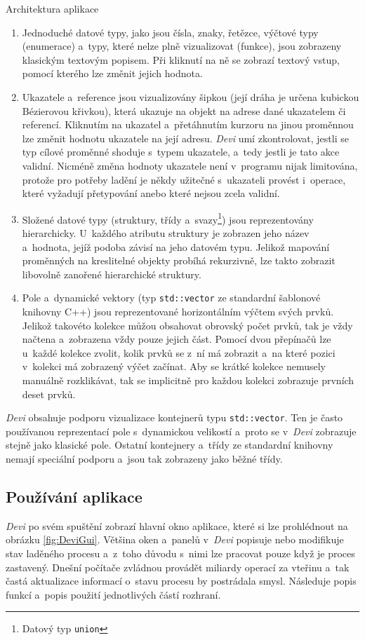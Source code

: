 \documentclass[czech,bachelor,male,python,dept460,hidelinks]{diploma}						%
\newcommand{\parspace}[1][]{
	\ifthenelse{\isempty{#1}}{\vspace{0mm}}{\vspace{#1}}
	\par
}
\begin{document}
\begin{section}{Architektura aplikace}
	\begin{enumerate}
		\item Jednoduché datové typy, jako jsou čísla, znaky, řetězce, výčtové typy (enumerace) a~typy, které nelze plně vizualizovat
			(funkce), jsou zobrazeny klasickým textovým popisem. Při kliknutí na ně se zobrazí textový vstup, pomocí kterého lze změnit jejich hodnota.
		\item Ukazatele a~reference jsou vizualizovány šipkou (její dráha je určena kubickou Bézierovou křivkou), která ukazuje na objekt na adrese
			dané ukazatelem či referencí. Kliknutím na ukazatel a~přetáhnutím kurzoru na jinou proměnnou lze změnit hodnotu ukazatele na její adresu.
			\textit{Devi} umí zkontrolovat, jestli se typ cílové proměnné shoduje s~typem ukazatele, a~tedy jestli je tato akce validní. Nicméně změna hodnoty
			ukazatele není v~programu nijak limitována, protože pro potřeby ladění je někdy užitečné s~ukazateli provést i~operace, které vyžadují přetypování anebo
			které nejsou zcela validní.
		\item Složené datové typy (struktury, třídy a~svazy\footnote{Datový typ \texttt{union}}) jsou reprezentovány hierarchicky. U~každého atributu
			struktury je zobrazen jeho název a~hodnota, jejíž podoba závisí na jeho datovém typu. Jelikož mapování proměnných na kreslitelné objekty probíhá
			rekurzivně, lze takto zobrazit libovolně zanořené hierarchické struktury.
		\item Pole a~dynamické vektory (typ \texttt{std::vector} ze standardní šablonové knihovny C++) jsou reprezentované horizontálním výčtem svých prvků.
			Jelikož takovéto kolekce můžou obsahovat obrovský počet prvků, tak je vždy načtena a~zobrazena vždy pouze jejich část. Pomocí dvou přepínačů lze u~každé
			kolekce zvolit, kolik prvků se z~ní má zobrazit a~na které pozici v~kolekci má zobrazený výčet začínat. Aby se krátké kolekce nemusely manuálně rozklikávat,
			tak se implicitně pro každou kolekci zobrazuje prvních deset prvků.
	\end{enumerate}
	
	\parspace \textit{Devi} obsahuje podporu vizualizace kontejnerů typu \texttt{std::vector}. Ten je často používanou
	reprezentací pole s~dynamickou velikostí a~proto se v~\textit{Devi} zobrazuje stejně jako klasické pole. Ostatní kontejnery a~třídy ze standardní knihovny
	nemají speciální podporu a~jsou tak zobrazeny jako běžné třídy.
	
	\subsection{Používání aplikace}
	\textit{Devi} po svém spuštění zobrazí hlavní okno aplikace, které si lze prohlédnout na obrázku \ref{fig:DeviGui}.
	Většina oken a~panelů v~\textit{Devi} popisuje nebo modifikuje stav laděného procesu a~z~toho důvodu s~nimi lze pracovat pouze když je proces
	zastavený. Dnešní počítače zvládnou provádět miliardy operací za vteřinu a~tak častá aktualizace informací o~stavu procesu by postrádala smysl.
	Následuje popis funkcí a~popis použití jednotlivých částí rozhraní.
	

\end{section}
\end{document}

